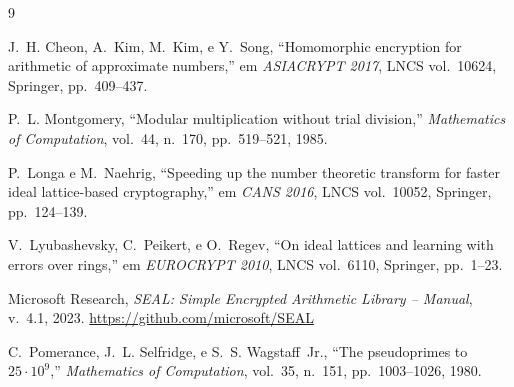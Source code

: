 \documentclass[11pt,a4paper]{article}
\begin{document}
\begin{thebibliography}{9}

J.~H. Cheon, A.~Kim, M.~Kim, e Y.~Song,
``Homomorphic encryption for arithmetic of approximate numbers,''
em \emph{ASIACRYPT 2017}, LNCS vol.~10624, Springer, pp.~409--437.

P.~L. Montgomery,
``Modular multiplication without trial division,''
\emph{Mathematics of Computation}, vol.~44, n.~170, pp.~519--521, 1985.

P.~Longa e M.~Naehrig,
``Speeding up the number theoretic transform for faster ideal lattice-based cryptography,''
em \emph{CANS 2016}, LNCS vol.~10052, Springer, pp.~124--139.

V.~Lyubashevsky, C.~Peikert, e O.~Regev,
``On ideal lattices and learning with errors over rings,''
em \emph{EUROCRYPT 2010}, LNCS vol.~6110, Springer, pp.~1--23.

Microsoft Research,
\emph{SEAL: Simple Encrypted Arithmetic Library -- Manual}, v.~4.1, 2023.
\url{https://github.com/microsoft/SEAL}

C.~Pomerance, J.~L. Selfridge, e S.~S. Wagstaff~Jr.,
``The pseudoprimes to $25\cdot10^9$,''
\emph{Mathematics of Computation}, vol.~35, n.~151, pp.~1003--1026, 1980.

\end{thebibliography}
\end{document}
